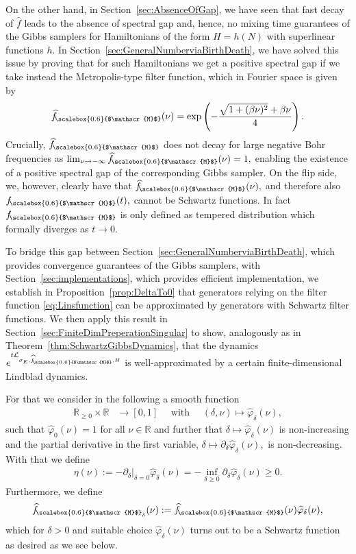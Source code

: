 \documentclass[11pt]{amsart}
\newcommand{\1}{\mathbbm{1}}
\newcommand{\R}{\mathbb{R}}
\newcommand{\cL}{\mathcal{L}}
\renewcommand{\phi}{\varphi}
\newcommand{\hatfM}{\widehat{f}_{\!\scalebox{0.6}{$\mathscr{M}$}}
}
\newcommand{\hatfMdelta}{\widehat{f}_{\!\scalebox{0.6}{$\mathscr{M}$}_\delta}}
\newcommand{\fM}{f_{\!\scalebox{0.6}{$\mathscr{M}$}}
}
\theoremstyle{plain}
\theoremstyle{definition}
\theoremstyle{remark}
\numberwithin{equation}{section}
\begin{document}
On the other hand, in Section~\ref{sec:AbsenceOfGap}, we have seen that fast decay of $\widehat f$ leads to the absence of spectral gap and, hence, no mixing time guarantees of the Gibbs samplers for Hamiltonians of the form $H=h(N)$ with superlinear functions $h$. In Section~\ref{sec:GeneralNumberviaBirthDeath}, we have solved this issue by proving that  for such Hamiltonians we get a positive spectral gap if we take instead the  Metropolis-type filter function, which in Fourier space is given by 
\begin{align}
\label{eq:Linsfunction}
\hatfM(\nu) = \exp\left(-\frac{\sqrt{1+(\beta\nu)^2} +\beta\nu}{4}\right)
.\end{align}
Crucially, $\hatfM$ does not decay for large negative Bohr frequencies as $\lim_{\nu\to-\infty}\hatfM(\nu)=1,$ enabling the existence of a positive spectral gap of the corresponding Gibbs sampler. On the flip side, we, however, clearly have that $
\hatfM(\nu),$ and therefore also $\fM(t),$ cannot be Schwartz functions. In fact $\fM$ is only defined as tempered distribution which formally diverges as $t\to 0.$ 

To bridge this gap between Section~\ref{sec:GeneralNumberviaBirthDeath}, which provides convergence guarantees of the Gibbs samplers, with Section~\ref{sec:implementations}, which provides efficient implementation, we establish in Proposition~\ref{prop:DeltaTo0} that generators relying on the filter function \eqref{eq:Linsfunction} can be approximated by generators with Schwartz filter functions. We then apply this result in Section~\ref{sec:FiniteDimPreperationSingular} to show, analogously as in Theorem~\ref{thm:SchwartzGibbsDynamics}, that the dynamics $e^{t\cL_{\sigma_E,\hatfM,H}}$ is well-approximated by a certain finite-dimensional Lindblad dynamics.

For that we consider in the following  a smooth function 
\begin{align*}
\R_{\ge 0}\times \R &\to [0,1]\quad\text{ with }\quad
(\delta,\nu) \mapsto \widehat \phi_\delta(\nu),
\end{align*}
such that $\widehat\phi_0(\nu) = 1$ for all $\nu\in\R$ and further that $\delta\mapsto \widehat\phi_\delta(\nu)$ is non-increasing and the partial derivative in the first variable, $\delta\mapsto \partial_\delta\widehat \phi_\delta(\nu),$ is non-decreasing. With that we define
\begin{align} 
\label{eq:Defeta}
\eta(\nu):=-\partial_\delta\Big|_{\delta=0}\widehat\phi_\delta(\nu) = -\inf_{\delta\ge 0}\partial_\delta\widehat\phi_\delta(\nu)\ge 0.
\end{align}
Furthermore, we define
\begin{align}
\label{eq:Deltahatf}
    \hatfMdelta(\nu) := \hatfM(\nu) \widehat \phi_\delta(\nu),  
\end{align}
which for $\delta>0$ and suitable choice $\widehat \phi_\delta(\nu)$ turns out to be  a Schwartz function as desired as we see below.
\end{document}
